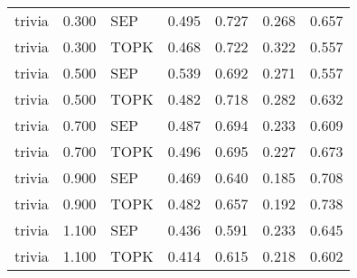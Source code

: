 \begin{tabular}{lrlrrrr}
trivia & 0.300 & SEP & 0.495 & 0.727 & 0.268 & 0.657 \\
trivia & 0.300 & TOPK & 0.468 & 0.722 & 0.322 & 0.557 \\
trivia & 0.500 & SEP & 0.539 & 0.692 & 0.271 & 0.557 \\
trivia & 0.500 & TOPK & 0.482 & 0.718 & 0.282 & 0.632 \\
trivia & 0.700 & SEP & 0.487 & 0.694 & 0.233 & 0.609 \\
trivia & 0.700 & TOPK & 0.496 & 0.695 & 0.227 & 0.673 \\
trivia & 0.900 & SEP & 0.469 & 0.640 & 0.185 & 0.708 \\
trivia & 0.900 & TOPK & 0.482 & 0.657 & 0.192 & 0.738 \\
trivia & 1.100 & SEP & 0.436 & 0.591 & 0.233 & 0.645 \\
trivia & 1.100 & TOPK & 0.414 & 0.615 & 0.218 & 0.602 \\
\bottomrule
\end{tabular}
